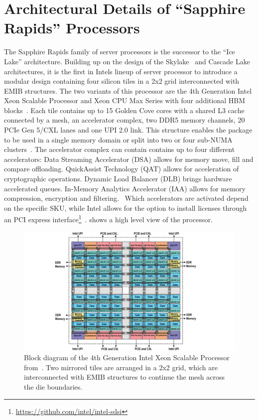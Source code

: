 \chapter{Architectural Details of ``Sapphire Rapids'' Processors}
\label{sec:arch}
The Sapphire Rapids family of server processors is the successor to the ``Ice Lake'' architecture.
Building up on the design of the Skylake~\cite{Schoene_2019_SKL} and Cascade Lake~\cite{Velten_2022_Rome_CLX} architectures, it is the first in Intels lineup of server processor to introduce a modular design containing four silicon tiles in a 2x2 grid interconnected with EMIB structures.
The two variants of this processor are the 4th Generation Intel Xeon Scalable Processor and Xeon CPU Max Series with four additional HBM blocks~\cite{Intel_2021_Hotchips}.
Each tile contains up to 15 Golden Cove cores with a shared L3 cache connected by a mesh, an accelerator complex, two DDR5 memory channels, 20 PCIe Gen 5/CXL lanes and one UPI 2.0 link.
This structure enables the package to be used in a single memory domain or split into two or four sub-NUMA clusters~\cite{Intel_4th_gen_scalable}.
The accelerator complex can contain contains up to four different accelerators:
Data Streaming Accelerator (DSA) allows for memory move, fill and compare offloading.
QuickAssist Technology (QAT) allows for acceleration of cryptographic operations.
Dynamic Load Balancer (DLB) brings hardware accelerated queues.
In-Memory Analytics Accelerator (IAA) allows for memory compression, encryption and filtering.~\cite{Yifan_2024_intel_accelerator_ecosystem,Yuan_2023_ISCA_tutorial,Intel_4th_gen_scalable}
Which accelerators are activated depend on the specific SKU, while Intel allows for the option to install licenses through an PCI express interface\footnote{\url{https://github.com/intel/intel-sdsi}}~\cite{Krenn_2025_Intel_on_demand}.
 shows a high level view of the processor.

\begin{figure}[]
    \centering
    \includegraphics[width=\columnwidth]{fig/spr-uma.png}
    \caption{\label{fig:spr-overview}Block diagram of the 4th Generation Intel Xeon Scalable Processor from~\cite{Intel_4th_gen_scalable}.
Two mirrored tiles are arranged in a 2x2 grid, which are interconnected with EMIB structures to continue the mesh across the die boundaries.~\cite{Intel_2022_ISSCC}}
\end{figure}

